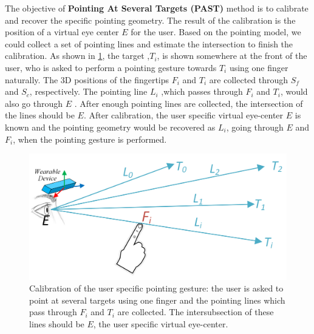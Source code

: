 The objective of \textbf{Pointing At Several Targets (PAST)} method is to calibrate and recover the specific pointing geometry. The result of the calibration is the position of a virtual eye center $E$ for the user. Based on the pointing model, we could collect a set of pointing lines and estimate the intersection to finish the calibration.
As shown in \figurename{ \ref{fig:4-PAST:PSATCalibration}}, the target ,$T_i$, is shown somewhere at the front of the user, who is asked to perform a pointing gesture towards $T_i$ using one finger naturally. The 3D positions of the fingertips $F_i$ and $T_i$ are collected through $S_f$ and $S_c$, respectively. The pointing line $L_i$ ,which passes through $F_i$ and $T_i$, would also go through $E$ . After enough pointing lines are collected, the intersection of the lines should be $E$. After calibration, the user specific virtual eye-center $E$ is known and the pointing geometry would be recovered as $L_{i}$, going through $E$ and  $F_i$, when the pointing gesture is performed.
\begin{figure} [htb]
	\centering
	\includegraphics[width= \linewidth]{figures/4-PAST/Calibration.png}
	\caption{Calibration of the user specific pointing gesture: the user is asked to point at several targets using one finger and the pointing lines which pass through $F_i$ and $T_i$ are collected. The intersubsection of these lines should be $E$, the user specific virtual eye-center.}
	\label{fig:4-PAST:PSATCalibration}
\end{figure}

